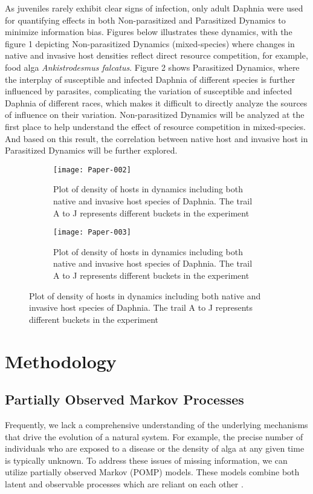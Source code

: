 \documentclass[12pt]{article}
\begin{document}
As juveniles rarely exhibit clear signs of infection, only adult Daphnia were used for quantifying effects in both Non-parasitized and Parasitized Dynamics to minimize information bias. Figures below illustrates these dynamics, with the figure 1 depicting Non-parasitized Dynamics (mixed-species) where changes in native and invasive host densities reflect direct resource competition, for example, food alga \textit{Ankistrodesmus falcatus}. Figure 2 shows Parasitized Dynamics, where the interplay of susceptible and infected Daphnia of different species is further influenced by parasites, complicating the variation of susceptible and infected Daphnia of different races, which makes it difficult to directly analyze the sources of influence on their variation. Non-parasitized Dynamics will be analyzed at the first place to help understand the effect of resource competition in mixed-species. And based on this result, the correlation between native host and invasive host in Parasitized Dynamics will be further explored.

\begin{figure}[htbp]
\centering
\begin{subfigure}[b]{\linewidth}
\texttt{[image: Paper-002]}
\caption{Plot of density of hosts in dynamics including both native and invasive host species of Daphnia. The trail A to J represents different buckets in the experiment}
\end{subfigure}
\begin{subfigure}[b]{\linewidth}
\texttt{[image: Paper-003]}
\caption{Plot of density of hosts in dynamics including both native and invasive host species of Daphnia. The trail A to J represents different buckets in the experiment}
\end{subfigure}%
\end{figure}

\section{Methodology}
\label{sec:meth}
\subsection{Partially Observed Markov Processes}
Frequently, we lack a comprehensive understanding of the underlying mechanisms that drive the evolution of a natural system. For example, the precise number of individuals who are exposed to a disease or the density of alga at any given time is typically unknown. To address these issues of missing information, we can utilize partially observed Markov (POMP) models. These models combine both latent and observable processes which are reliant on each other \cite{bhadra2011malaria}.\\
\end{document}

